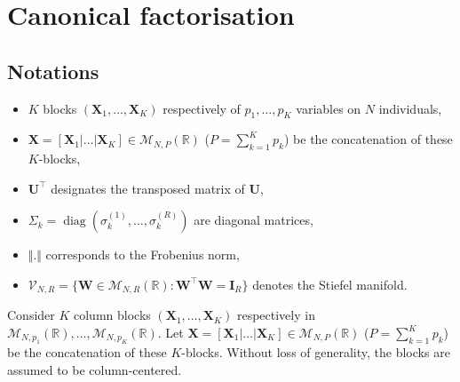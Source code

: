 \documentclass[11pt]{article}
\DeclareMathOperator{\diag}{diag}
\newcommand{\W}{\mathbf{W}}
\newcommand{\I}{\mathbf{I}}
\newcommand{\Stiefel}[2]{\mathcal V_{#1,#2}}
\begin{document}

\section{Canonical factorisation}
\subsection*{Notations}

\begin{itemize}
	\item $K$ blocks  $(\textbf{X}_1,\ldots,\textbf{X}_K)$ respectively of $p_1,\ldots,p_K$ variables on $N$ individuals,
	\item  $\textbf{X}=[\textbf{X}_1|\ldots|\textbf{X}_K]\in \mathcal M_{N,P}(\mathbb R)$ ($P=\sum_{k=1}^K p_k$) be the concatenation of these $K$-blocks,
	\item $\textbf{U}^\intercal$ designates the transposed matrix of $\textbf{U}$, 
	\item $\Sigma_k=\diag(\sigma_k^{(1)},\ldots,\sigma_k^{(R)})$ are diagonal matrices,
	\item $\Vert . \Vert$ corresponds to the Frobenius norm,
	\item $\Stiefel{N}{R}=\{\W\in\mathcal M_{N,R}(\mathbb R):\W^\intercal\W=\I_R\}$
denotes the Stiefel manifold.
\end{itemize}
 
Consider $K$ column blocks  $(\textbf{X}_1,\ldots,\textbf{X}_K)$ respectively in $\mathcal M_{N,p_1}(\mathbb R),...,\mathcal M_{N,p_K}(\mathbb R)$. Let $\textbf{X}=[\textbf{X}_1|\ldots|\textbf{X}_K]\in \mathcal M_{N,P}(\mathbb R)$ ($P=\sum_{k=1}^K p_k$) be the concatenation of these $K$-blocks. Without loss of generality, the blocks are assumed to be column-centered.
\end{document}
